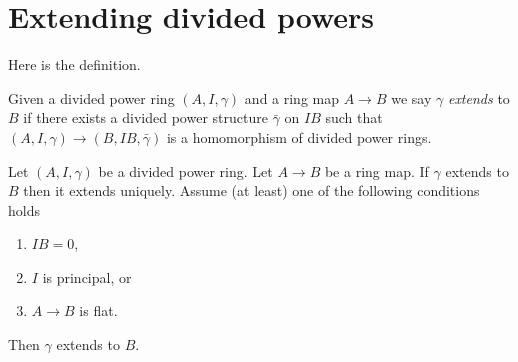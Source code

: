 \section{Extending divided powers}
\label{section-extend}

\noindent
Here is the definition.

\begin{definition}
\label{definition-extends}
Given a divided power ring $(A, I, \gamma)$ and a ring map
$A \to B$ we say $\gamma$ {\it extends} to $B$ if there exists a
divided power structure $\bar \gamma$ on $IB$ such that
$(A, I, \gamma) \to (B, IB, \bar\gamma)$ is a homomorphism of
divided power rings.
\end{definition}

\begin{lemma}
\label{lemma-gamma-extends}
Let $(A, I, \gamma)$ be a divided power ring.
Let $A \to B$ be a ring map.
If $\gamma$ extends to $B$ then it extends uniquely.
Assume (at least) one of the following conditions holds
\begin{enumerate}
\item $IB = 0$,
\item $I$ is principal, or
\item $A \to B$ is flat.
\end{enumerate}
Then $\gamma$ extends to $B$.
\end{lemma}

